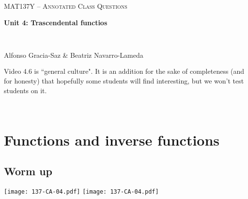 \documentclass[11pt]{article}
\begin{document}
\thispagestyle{empty}
	\begin{center}
		{ {\LARGE  \scshape
		\textcolor{137cp3}{MAT137Y --   Annotated Class Questions}
		}
		
		\medskip
		{\bf \Large \textcolor{137cp1}{Unit 4: Trascendental functios
		}}
		
		\
		
		\medskip
		{\large
		\textcolor{137cp1}{Alfonso Gracia-Saz \& Beatriz Navarro-Lameda}
		}}
	\end{center}

\vspace{5mm}

Video 4.6 is ``general culture".  It is an addition for the  sake of completeness (and for honesty) that hopefully some students will find interesting, but we won't test students on it.

\

\tableofcontents

\newpage
\section{Functions and inverse functions}

\subsection{Worm up} 

\begin{center}
{ \texttt{[image: 137-CA-04.pdf]}} \quad
{ \texttt{[image: 137-CA-04.pdf]}} 
\end{center}
\end{document}
